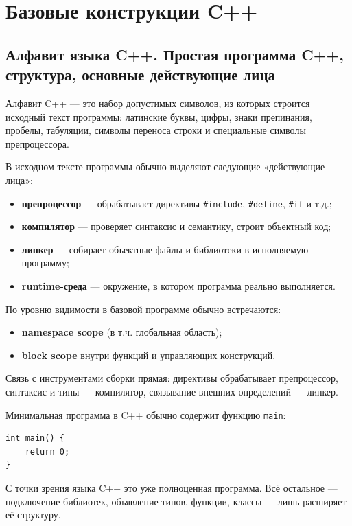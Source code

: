 \section{Базовые конструкции C++}

\subsection{Алфавит языка C++. Простая программа C++, структура, основные действующие лица}
\begin{definition}
Алфавит C++ — это набор допустимых символов, из которых строится исходный текст программы: латинские буквы, цифры, знаки препинания, пробелы, табуляции, символы переноса строки и специальные символы препроцессора.
\end{definition}

В исходном тексте программы обычно выделяют следующие «действующие лица»:
\begin{itemize}
    \item \textbf{препроцессор} — обрабатывает директивы \texttt{\#include}, \texttt{\#define}, \texttt{\#if} и т.д.;
    \item \textbf{компилятор} — проверяет синтаксис и семантику, строит объектный код;
    \item \textbf{линкер} — собирает объектные файлы и библиотеки в исполняемую программу;
    \item \textbf{runtime-среда} — окружение, в котором программа реально выполняется.
\end{itemize}

По уровню видимости в базовой программе обычно встречаются:
\begin{itemize}
    \item \textbf{namespace scope} (в т.ч. глобальная область);
    \item \textbf{block scope} внутри функций и управляющих конструкций.
\end{itemize}

Связь с инструментами сборки прямая: директивы обрабатывает препроцессор, синтаксис и типы — компилятор, связывание внешних определений — линкер.

Минимальная программа в C++ обычно содержит функцию \texttt{main}:
\begin{verbatim}
int main() {
    return 0;
}
\end{verbatim}

\begin{remark}
С точки зрения языка C++ это уже полноценная программа. Всё остальное — подключение библиотек, объявление типов, функции, классы — лишь расширяет её структуру.
\end{remark}

